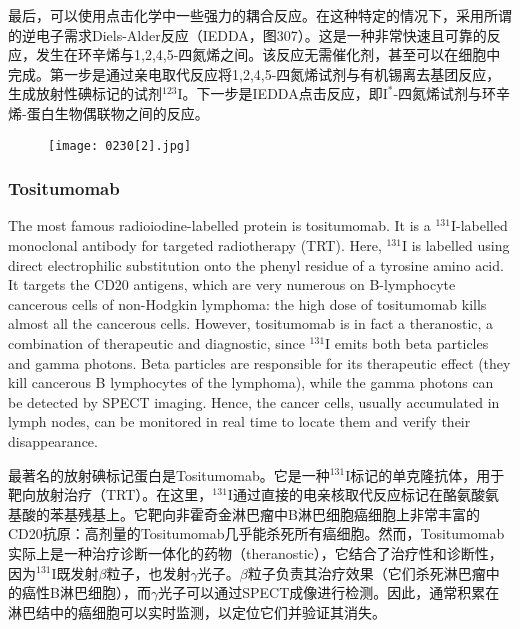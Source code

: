 \documentclass[dvipsnames, svgnames,a4paper,11pt]{article}
\begin{document}
最后，可以使用点击化学中一些强力的耦合反应。在这种特定的情况下，采用所谓的逆电子需求Diels-Alder反应（IEDDA，图307）。这是一种非常快速且可靠的反应，发生在环辛烯与1,2,4,5-四氮烯之间。该反应无需催化剂，甚至可以在细胞中完成。第一步是通过亲电取代反应将1,2,4,5-四氮烯试剂与有机锡离去基团反应，生成放射性碘标记的试剂\(\mathrm{^{123}I}\)。下一步是IEDDA点击反应，即\(\mathrm{I^{*}}\)-四氮烯试剂与环辛烯-蛋白生物偶联物之间的反应。

\begin{figure}[h]
	\centering
    \texttt{[image: 0230[2].jpg]}  
     \label{fig307}
\end{figure}

\subsubsection{Tositumomab}  
The most famous radioiodine-labelled protein is tositumomab. It is a \(\mathrm{^{131}I}\)-labelled monoclonal antibody for targeted radiotherapy (TRT). Here, \(\mathrm{^{131}I}\) is labelled using direct electrophilic substitution onto the phenyl residue of a tyrosine amino acid. It targets the CD20 antigens, which are very numerous on B-lymphocyte cancerous cells of non-Hodgkin lymphoma: the high dose of tositumomab kills almost all the cancerous cells. However, tositumomab is in fact a theranostic, a combination of therapeutic and diagnostic, since \(\mathrm{^{131}I}\) emits both beta particles and gamma photons. Beta particles are responsible for its therapeutic effect (they kill cancerous B lymphocytes of the lymphoma), while the gamma photons can be detected by SPECT imaging. Hence, the cancer cells, usually accumulated in lymph nodes, can be monitored in real time to locate them and verify their disappearance.

最著名的放射碘标记蛋白是Tositumomab。它是一种\(\mathrm{^{131}I}\)标记的单克隆抗体，用于靶向放射治疗（TRT）。在这里，\(\mathrm{^{131}I}\)通过直接的电亲核取代反应标记在酪氨酸氨基酸的苯基残基上。它靶向非霍奇金淋巴瘤中B淋巴细胞癌细胞上非常丰富的CD20抗原：高剂量的Tositumomab几乎能杀死所有癌细胞。然而，Tositumomab实际上是一种治疗诊断一体化的药物（theranostic），它结合了治疗性和诊断性，因为\(\mathrm{^{131}I}\)既发射\(\beta\)粒子，也发射$\gamma$光子。\(\beta\)粒子负责其治疗效果（它们杀死淋巴瘤中的癌性B淋巴细胞），而$\gamma$光子可以通过SPECT成像进行检测。因此，通常积累在淋巴结中的癌细胞可以实时监测，以定位它们并验证其消失。
\end{document}
